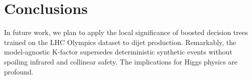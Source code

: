 \section{Conclusions}\label{sec:conclusions}

In future work, we plan to apply the local significance of boosted
decision trees trained on the LHC Olympics dataset to dijet production.
Remarkably, the model-agnostic K-factor supersedes deterministic
synthetic events without spoiling infrared and collinear safety. The
implications for Higgs physics are profound.

